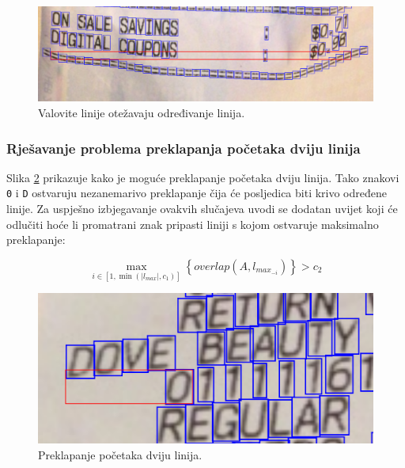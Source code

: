 \documentclass[times, utf8, zavrsni]{fer}
\begin{document}
\begin{figure}[htb]
    \centering
    \captionsetup{justification=centering,margin=2cm}
    \includegraphics[width=\textwidth]{images/aligner-01.png}
    \caption{Valovite linije otežavaju određivanje linija.}
    \label{fig:aligner-01}
\end{figure}

\pagebreak

\subsubsection{Rješavanje problema preklapanja početaka dviju linija}
Slika \ref{fig:overlap-01} prikazuje kako je moguće preklapanje početaka dviju
linija. Tako znakovi \lstinline{0} i \lstinline{D}
ostvaruju nezanemarivo preklapanje čija će posljedica biti krivo određene
linije. Za uspješno izbjegavanje ovakvih slučajeva uvodi se dodatan uvijet
koji će odlučiti hoće li promatrani znak pripasti liniji s kojom ostvaruje
maksimalno preklapanje:

\begin{equation}
\label{eq:overlap-03}
\max_{i \in [1, \min(|l_{max}|, c_1)]}\left\{\textit{overlap}(A, l_{max_{-i}})\right\} > c_2
\end{equation}

\begin{figure}[htb]
    \centering
    \captionsetup{justification=centering,margin=2cm}
    \includegraphics[width=\textwidth]{images/overlap-01.png}
    \caption{Preklapanje početaka dviju linija.}
    \label{fig:overlap-01}
\end{figure}
\end{document}

